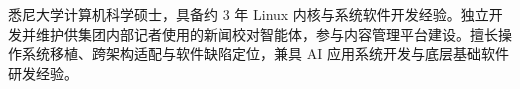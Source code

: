 

\begin{cvparagraph}

悉尼大学计算机科学硕士，具备约 3 年 Linux 内核与系统软件开发经验。独立开发并维护供集团内部记者使用的新闻校对智能体，参与内容管理平台建设。擅长操作系统移植、跨架构适配与软件缺陷定位，兼具 AI 应用系统开发与底层基础软件研发经验。

\end{cvparagraph}
